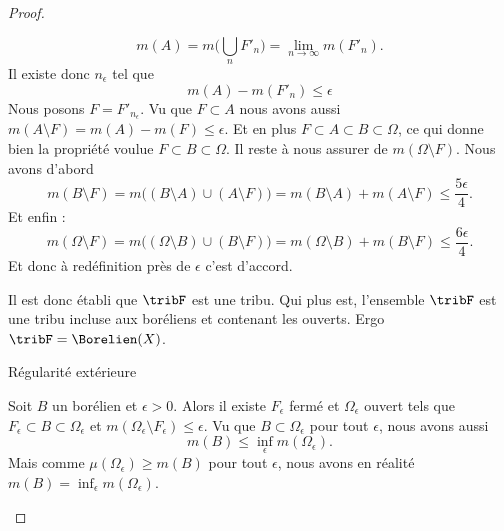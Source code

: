 \begin{proof}
\begin{subproof}
\begin{subproof}
                    \begin{equation}
                        m(A)=m\big( \bigcup_nF'_n \big)=\lim_{n\to \infty} m(F'_n).
                    \end{equation}
                    Il existe donc \( n_{\epsilon}\) tel que
                    \begin{equation}
                        m(A)-m(F'_{n})\leq \epsilon
                    \end{equation}
                    Nous posons \( F=F'_{n_{\epsilon}}\). Vu que \( F\subset A\) nous avons aussi \( m(A\setminus F)=m(A)-m(F)\leq \epsilon\). Et en plus \( F\subset A\subset B\subset \Omega\), ce qui donne bien la propriété voulue \( F\subset B\subset \Omega\). Il reste à nous assurer de \( m(\Omega\setminus F)\). Nous avons d'abord
                    \begin{equation}
                        m(B\setminus F)=m\big( (B\setminus A)\cup (A\setminus F) \big)=m(B\setminus A)+m(A\setminus F)\leq \frac{ 5\epsilon }{ 4 }.
                    \end{equation}
                    Et enfin :
                    \begin{equation}
                        m(\Omega\setminus F)=m\big( (\Omega\setminus B)\cup (B\setminus F) \big)=m(\Omega\setminus B)+m(B\setminus F)\leq \frac{ 6\epsilon }{ 4 }.
                    \end{equation}
                    Et donc à redéfinition près de \( \epsilon\) c'est d'accord.

                \end{subproof}

                Il est donc établi que \( \tribF\) est une tribu. Qui plus est, l'ensemble \( \tribF\) est une tribu incluse aux boréliens et contenant les ouverts. Ergo \( \tribF=\Borelien(X)\).

            \item[Régularité extérieure]

                Soit \( B\) un borélien et \( \epsilon>0\). Alors il existe \( F_{\epsilon}\) fermé et \( \Omega_{\epsilon} \) ouvert tels que \( F_{\epsilon}\subset B\subset \Omega_{\epsilon}\) et \( m(\Omega_{\epsilon}\setminus F_{\epsilon})\leq \epsilon\). Vu que \( B\subset \Omega_{\epsilon}\) pour tout \( \epsilon\), nous avons aussi
                \begin{equation}
                    m(B)\leq \inf_{\epsilon}m(\Omega_{\epsilon}).
                \end{equation}
                Mais comme \( \mu(\Omega_{\epsilon})\geq m(B)\) pour tout \( \epsilon\), nous avons en réalité \( m(B)=\inf_{\epsilon}m(\Omega_{\epsilon})\).


\end{subproof}
\end{proof}
